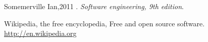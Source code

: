 \documentclass[a4paper,12pt]{report}
\begin{document}
\maketitle{}

\newpage
\tableofcontents{}

\newpage
\listoffigures{}


\newpage


\newpage
%
\newpage
%
\newpage
%
\newpage
%
\newpage
%
\newpage
%
\newpage
%


\begin{thebibliography}{99}

 Somemerville Ian,2011 .
  \textit{Software engineering, 9th edition}.

Wikipedia, the free encyclopedia, Free and open source software.
\url{http://en.wikipedia.org}

\end{thebibliography}
\end{document}

